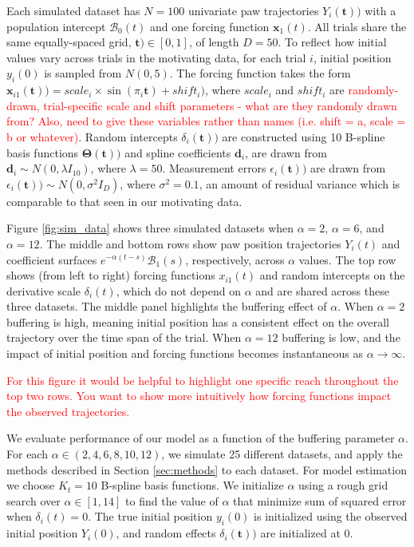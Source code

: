 \documentclass[preprint]{JASA}
\begin{document}
Each simulated dataset has \(N = 100\) univariate paw trajectories
\(Y_i(\mathbf{t}))\) with a population intercept \(\mathcal{B}_0(t)\)
and one forcing function \(\mathbf{x}_1(t)\). All trials share the same
equally-spaced grid, \(\mathbf{t}) \in [0, 1]\), of length \(D = 50\).
To reflect how initial values vary across trials in the motivating data,
for each trial \(i\), initial position \(y_i(0)\) is sampled from
\(N(0, 5)\). The forcing function takes the form
\(\mathbf{x}_{i1}(\mathbf{t})) = scale_i \times \sin(\pi_i \mathbf{t}) + shift_i)\),
where \(scale_i\) and \(shift_i\) are
\textcolor{red}{randomly-drawn, trial-specific scale and shift parameters - what are they randomly drawn from? Also, need to give these variables rather than names (i.e. shift = a, scale = b or whatever)}.
Random intercepts \(\delta_i(\mathbf{t}))\) are constructed using 10
B-spline basis functions \(\mathbf{\Theta}(\mathbf{t}))\) and spline
coefficients \(\mathbf{d}_i\), are drawn from
\(\mathbf{d}_i \sim N(0, \lambda I_{10})\), where \(\lambda = 50\).
Measurement errors \(\epsilon_i(\mathbf{t}))\) are drawn from
\(\epsilon_i(\mathbf{t})) \sim N(0, \sigma^2 I_{D})\), where
\(\sigma^2 = 0.1\), an amount of residual variance which is comparable
to that seen in our motivating data.

Figure \ref{fig:sim_data} shows three simulated datasets when
\(\alpha = 2\), \(\alpha = 6\), and \(\alpha = 12\). The middle and
bottom rows show paw position trajectories \(Y_i(t)\) and coefficient
surfaces \(e^{-\alpha (t-s)} \mathcal{B}_1(s)\), respectively, across
\(\alpha\) values. The top row shows (from left to right) forcing
functions \(x_{i1}(t)\) and random intercepts on the derivative scale
\(\delta_i(t)\), which do not depend on \(\alpha\) and are shared across
these three datasets. The middle panel highlights the buffering effect
of \(\alpha\). When \(\alpha = 2\) buffering is high, meaning initial
position has a consistent effect on the overall trajectory over the time
span of the trial. When \(\alpha = 12\) buffering is low, and the impact
of initial position and forcing functions becomes instantaneous as
\(\alpha \to \infty\).

\textcolor{red}{For this figure it would be helpful to highlight one specific reach throughout the top two rows. You want to show more intuitively how forcing functions impact the observed trajectories.}

We evaluate performance of our model as a function of the buffering
parameter \(\alpha\). For each \(\alpha \in (2, 4, 6, 8, 10, 12)\), we
simulate 25 different datasets, and apply the methods described in
Section \ref{sec:methods} to each dataset. For model estimation we
choose \(K_t = 10\) B-spline basis functions. We initialize \(\alpha\)
using a rough grid search over \(\alpha \in [1, 14]\) to find the value
of \(\alpha\) that minimize sum of squared error when
\(\delta_i(t) = 0\). The true initial position \(y_i(0)\) is initialized
using the observed initial position \(Y_i(0)\), and random effects
\(\delta_i(\mathbf{t}))\) are initialized at 0.
\end{document}
